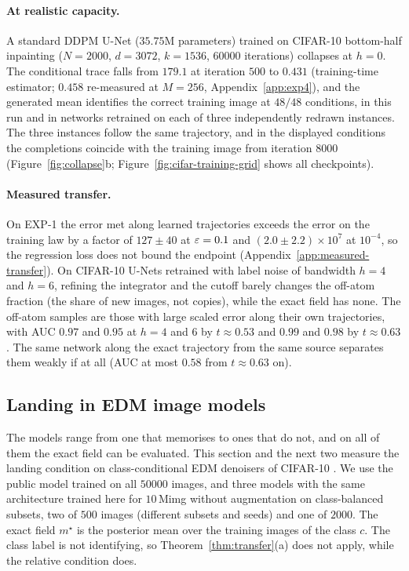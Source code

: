 \documentclass{article} %
\theoremstyle{plain}
\theoremstyle{definition}
\theoremstyle{remark}
\begin{document}
\label{sec:cifarddpm}
\paragraph{At realistic capacity.} A standard DDPM U-Net ($35.75$M parameters) trained on
CIFAR-10 bottom-half inpainting ($N{=}2000$, $d{=}3072$, $k{=}1536$, $60000$ iterations) collapses
at $h{=}0$. The conditional trace falls from $179.1$ at iteration $500$ to $0.431$ (training-time
estimator; $0.458$ re-measured at $M=256$, Appendix~\ref{app:exp4}), and the
generated mean identifies the correct training image at $48/48$ conditions, in this run and in
networks retrained on each of three independently redrawn instances. The three instances follow the
same trajectory, and in the displayed conditions the completions coincide with the training image
from iteration $8000$ (Figure~\ref{fig:collapse}b; Figure~\ref{fig:cifar-training-grid} shows all
checkpoints).

\paragraph{Measured transfer.} On EXP-1 the error met along learned trajectories exceeds the
error on the training law by a factor of $127\pm40$ at $\varepsilon=0.1$ and $(2.0\pm2.2)\times10^7$ at
$10^{-4}$, so the regression loss does not bound the endpoint (Appendix~\ref{app:measured-transfer}).
On CIFAR-10 U-Nets retrained with label noise of bandwidth $h=4$ and $h=6$, refining the integrator
and the cutoff barely changes the off-atom fraction (the share of new images, not copies), while the exact field has none. The off-atom
samples are those with large scaled error along their own trajectories, with
AUC $0.97$ and $0.95$ at $h=4$ and $6$ by
$t\approx0.53$ and $0.99$ and $0.98$ by $t\approx0.63$. The same network along the exact
trajectory from the same source separates them weakly if at all (AUC at most $0.58$ from
$t\approx0.63$ on).

\FloatBarrier

\subsection{Landing in EDM image models}
\label{sec:edm}

The models range from one that memorises to ones that do not, and on all of them the exact field
can be evaluated. This section and the next two measure the landing condition on class-conditional
EDM denoisers of CIFAR-10 \citep{karras2022elucidating}. We use the public model trained on all
$50000$ images, and three models with the same architecture trained here for $10$\,Mimg without
augmentation on class-balanced subsets, two of $500$ images (different subsets and seeds) and one of
$2000$. The exact field $m^\star$ is the posterior mean over the training images of the class $c$.
The class label is not identifying, so Theorem~\ref{thm:transfer}(a) does not apply, while the relative
condition does.
\end{document}
